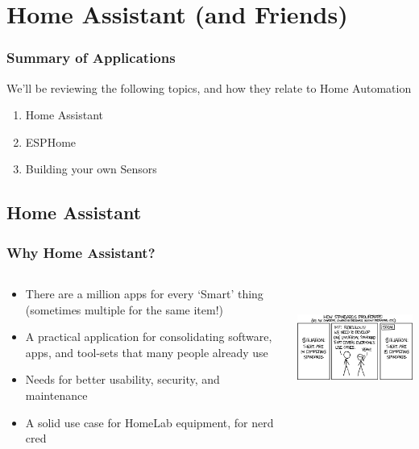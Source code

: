 \documentclass[aspectratio=169]{beamer}
\begin{document}
\section{Home Assistant (and Friends)}
\frame{\sectionpage}

\begin{frame}
  \frametitle{Summary of Applications}
  We'll be reviewing the following topics, and how they relate to Home Automation
  \begin{enumerate}
    \item{Home Assistant}
    \item{ESPHome}
    \item{Building your own Sensors}
  \end{enumerate}
\end{frame}

\subsection{Home Assistant}
\frame{\subsectionpage}

\begin{frame}[fragile]
  \frametitle{Why Home Assistant?}
  \begin{columns}[]
    \begin{column}[T]{0.45\paperwidth}
      \begin{itemize}%
        \item{There are a million apps for every `Smart' thing (sometimes multiple for the same item!)}
        \item{A practical application for consolidating software, apps, and tool-sets that many people already use}
        \item{Needs for better usability, security, and maintenance}
        \item{A solid use case for HomeLab equipment, for nerd cred}
     \end{itemize}
    \end{column}
    \begin{column}[T]{0.45\paperwidth}
      \includegraphics[height=4cm,keepaspectratio]{images/standards.png}
    \end{column}
  \end{columns}
\end{frame}
\end{document}
